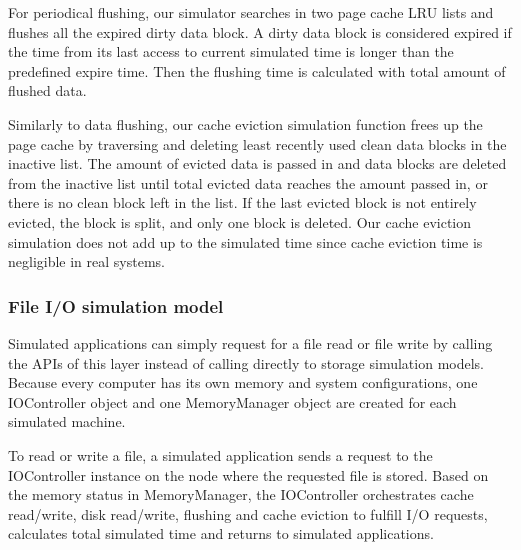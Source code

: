 \documentclass[conference]{IEEEtran}
\begin{document}
			For periodical flushing, our simulator searches in two page cache 
			LRU lists and flushes all the expired dirty data block. 
			A dirty data block is considered expired if the time from its last access 
			to current simulated time is longer than the predefined expire time. 
			Then the flushing time is calculated with total amount of flushed data.
				
			Similarly to data flushing, our cache eviction simulation function frees up 
			the page cache by traversing and deleting least recently used clean 
			data blocks in the inactive list.
			The amount of evicted data is passed in and data blocks are deleted 
			from the inactive list until total evicted data reaches the amount 
			passed in, or there is no clean block left in the list.
			If the last evicted block is not entirely evicted, the block is split, 
			and only one block is deleted.
			Our cache eviction simulation does not add up to the simulated time 
			since cache eviction time is negligible in real systems.			
			
			\subsubsection{File I/O simulation model}			
			
			Simulated applications can simply request for a file read 
			or file write by calling the APIs of this layer instead of 
			calling directly to storage simulation models.
			Because every computer has its own memory and system configurations, 
			one IOController object and one MemoryManager object are created 
			for each simulated machine.
			
			To read or write a file, a simulated application sends a request to the 
			IOController instance on the node where the requested file is stored.
			Based on the memory status in MemoryManager, the IOController 
			orchestrates cache read/write, disk read/write, flushing and cache eviction 
			to fulfill I/O requests, calculates total simulated time and returns to 
			simulated applications.
			
\end{document}
